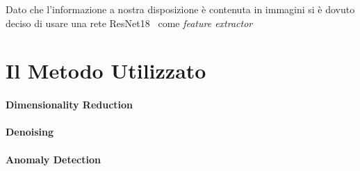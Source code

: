 Dato che l'informazione a nostra disposizione è contenuta in immagini si è dovuto deciso di usare una rete ResNet18~\cite{resnet} come \textit{feature extractor}
























\clearpage
\section{Il Metodo Utilizzato}

\paragraph{Dimensionality Reduction}

\paragraph{Denoising}

\paragraph{Anomaly Detection}


